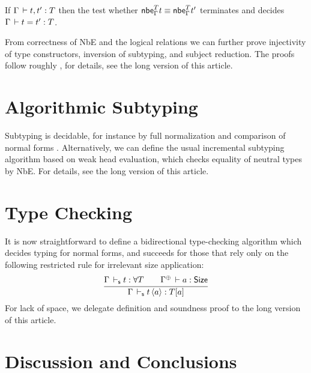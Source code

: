 \documentclass[acmlarge,review,anonymous]{acmart}\settopmatter{printfolios=true}
\newcommand{\LONGVERSION}[1]{}
\newcommand{\SHORTVERSION}[1]{#1}
\begin{document}
\begin{corollary}
  If\/ $\Gamma \,\vdash t,t' : T$ then the test whether $\mathsf{nbe}_{\Gamma}^{T} t \equiv \mathsf{nbe}_{\Gamma}^{T}{t'}$
  terminates and
  decides $\Gamma \,\vdash t = t' : T$.
\end{corollary}
\LONGVERSION{
\begin{proof}
  Follows directly from soundness (which includes termination) and completeness of NbE.
\end{proof}
} %

\LONGVERSION{

} %
\SHORTVERSION{
From correctness of NbE and the logical relations we can further prove
injectivity of type constructors, inversion of subtyping, and subject reduction.
The proofs follow roughly \citet{fridlenderPagano:tlca13}, for
details, see the long version of this article.
} %

\section{Algorithmic Subtyping}
\label{sec:asub}

\LONGVERSION{

} %
\SHORTVERSION{
Subtyping is decidable, for instance by full normalization
and comparison of normal forms
\cite{fridlenderPagano:tlca13}.
Alternatively, we can define the usual incremental subtyping algorithm
based on weak head evaluation, which checks equality of neutral types
by NbE.  For details, see the long version of this article.
} %


\section{Type Checking}
\label{sec:tycheck}

\LONGVERSION{

} %
\SHORTVERSION{
It is now straightforward to define a bidirectional type-checking
algorithm which decides typing for normal forms, and succeeds for
those that rely only on the following restricted rule for irrelevant
size application:
\[
  \ru{\Gamma \ders t : \forall T \qquad
      \resurrect\Gamma \der a : \Size
    }{\Gamma \ders t\, \ann a : T[a]}
\]
For lack of space, we delegate definition and soundness proof to the
long version of this article.
} %

\section{Discussion and Conclusions}
\label{sec:concl}
\end{document}
